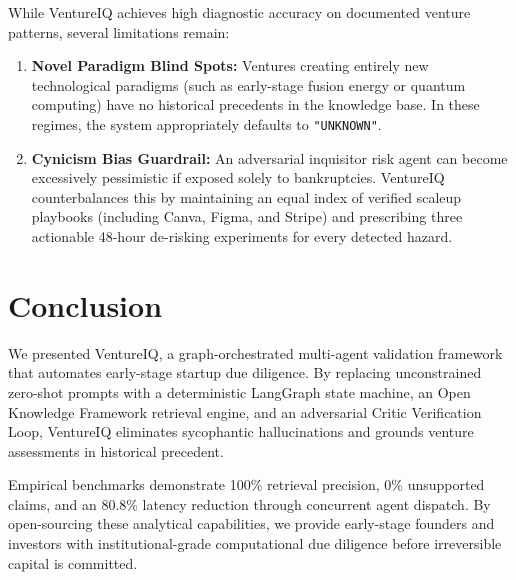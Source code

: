 \documentclass[conference]{IEEEtran}
\begin{document}
While VentureIQ achieves high diagnostic accuracy on documented venture patterns, several limitations remain:
\begin{enumerate}
    \item \textbf{Novel Paradigm Blind Spots:} Ventures creating entirely new technological paradigms (such as early-stage fusion energy or quantum computing) have no historical precedents in the knowledge base. In these regimes, the system appropriately defaults to \texttt{"UNKNOWN"}.
    \item \textbf{Cynicism Bias Guardrail:} An adversarial inquisitor risk agent can become excessively pessimistic if exposed solely to bankruptcies. VentureIQ counterbalances this by maintaining an equal index of verified scaleup playbooks (including Canva, Figma, and Stripe) and prescribing three actionable 48-hour de-risking experiments for every detected hazard.
\end{enumerate}

\section{Conclusion}

We presented VentureIQ, a graph-orchestrated multi-agent validation framework that automates early-stage startup due diligence. By replacing unconstrained zero-shot prompts with a deterministic LangGraph state machine, an Open Knowledge Framework retrieval engine, and an adversarial Critic Verification Loop, VentureIQ eliminates sycophantic hallucinations and grounds venture assessments in historical precedent. 

Empirical benchmarks demonstrate 100\% retrieval precision, 0\% unsupported claims, and an 80.8\% latency reduction through concurrent agent dispatch. By open-sourcing these analytical capabilities, we provide early-stage founders and investors with institutional-grade computational due diligence before irreversible capital is committed.
\end{document}
